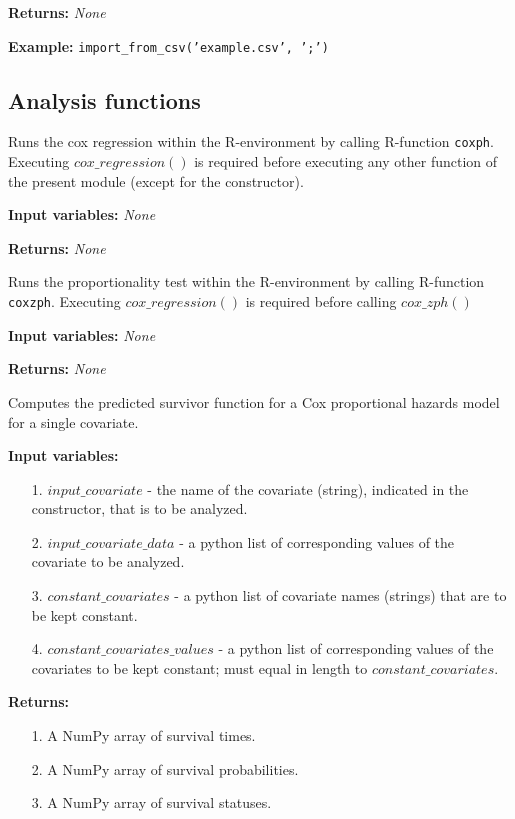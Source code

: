\documentclass[twoside,a4paper]{refart}
\begin{document}
\textbf{Returns:} \textit{None}

\textbf{Example:} \texttt{import\_from\_csv('example.csv', ';')}



\subsection{Analysis functions}

Runs the cox regression within the R-environment by calling R-function \texttt{coxph}. Executing $cox\_regression()$ is required before executing any other function of the present module (except for the constructor).

\textbf{Input variables:} \textit{None}

\textbf{Returns:} \textit{None}


Runs the proportionality test within the R-environment by calling R-function \texttt{coxzph}. Executing $cox\_regression()$ is required before calling $cox\_zph()$

\textbf{Input variables:} \textit{None}

\textbf{Returns:} \textit{None}


Computes the predicted survivor function for a Cox proportional hazards model for a single covariate.

\textbf{Input variables:}
\begin{itemize}
    \item[1.] $input\_covariate$ - the name of the covariate (string), indicated in the constructor, that is to be analyzed.
    \item[2.] $input\_covariate\_data$ - a python list of corresponding values of the covariate to be analyzed.
    \item[3.] $constant\_covariates$ - a python list of covariate names (strings) that are to be kept constant.
    \item[4.] $constant\_covariates\_values$ - a python list of corresponding values of the covariates to be kept constant; must equal in length to $constant\_covariates$.
\end{itemize}

\textbf{Returns:}
\begin{itemize}
    \item[1.] A NumPy array of survival times.
    \item[2.] A NumPy array of survival probabilities.
    \item[3.] A NumPy array of survival statuses.
\end{itemize}
\end{document}
